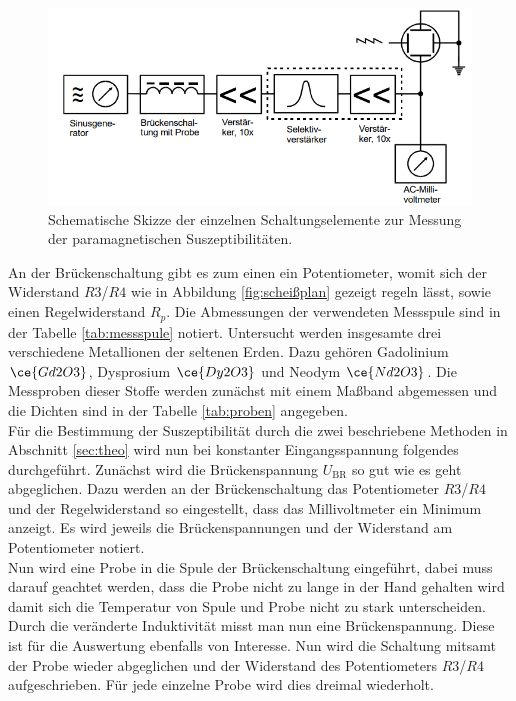 \begin{figure}
    \centering
    \includegraphics[width=\textwidth]{bilder/aufbaumessung.png}
    \caption{Schematische Skizze der einzelnen Schaltungselemente zur Messung der paramagnetischen Suszeptibilitäten. \cite{skript}} 
    \label{fig:aufbaumessung}
\end{figure}

An der Brückenschaltung gibt es zum einen ein Potentiometer, womit sich der Widerstand $R3$/$R4$ wie in Abbildung \ref{fig:scheißplan} gezeigt regeln lässt, sowie einen Regelwiderstand $R_{p}$. Die Abmessungen der verwendeten Messspule sind in der Tabelle \ref{tab:messspule} notiert. 
Untersucht werden insgesamte drei verschiedene Metallionen der seltenen Erden. Dazu gehören Gadolinium $\ce{Gd2O3}$, Dysprosium $\ce{Dy2O3}$ und Neodym $\ce{Nd2O3}$. Die Messproben dieser Stoffe werden zunächst mit einem Maßband abgemessen und die Dichten sind in der Tabelle \ref{tab:proben} angegeben.
\\
\newline
Für die Bestimmung der Suszeptibilität durch die zwei beschriebene Methoden in Abschnitt \ref{sec:theo} wird nun bei konstanter Eingangsspannung folgendes durchgeführt. 
Zunächst wird die Brückenspannung $U_{\text{BR}}$ so gut wie es geht abgeglichen. Dazu werden an der Brückenschaltung das Potentiometer $R3$/$R4$ und der Regelwiderstand so eingestellt, dass das Millivoltmeter ein Minimum anzeigt. Es wird jeweils die Brückenspannungen und der
Widerstand am Potentiometer notiert. 
\\
Nun wird eine Probe in die Spule der Brückenschaltung eingeführt, dabei muss darauf geachtet werden, dass die Probe nicht zu lange in der Hand gehalten wird damit sich die Temperatur von Spule und Probe nicht zu stark unterscheiden. Durch die 
veränderte Induktivität misst man nun eine Brückenspannung. Diese ist für die Auswertung ebenfalls von Interesse. Nun wird die Schaltung mitsamt der Probe wieder abgeglichen und der Widerstand des Potentiometers $R3$/$R4$ aufgeschrieben. Für
jede einzelne Probe wird dies dreimal wiederholt.